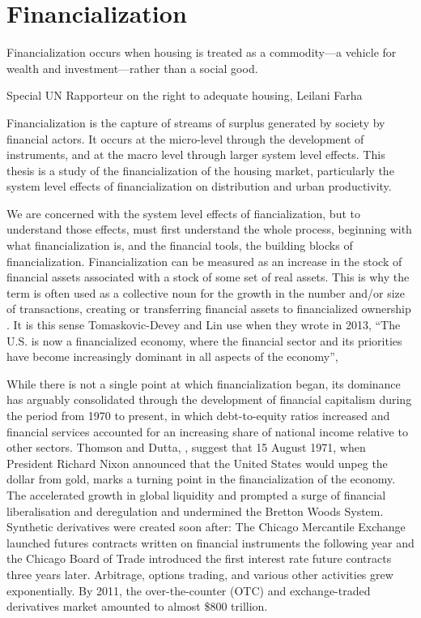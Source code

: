 \chapter{Financialization} \label{chapter-financialization}
\epigraph{Financialization occurs when housing is treated as a commodity---a vehicle for wealth and investment---rather than a social good.}{Special UN Rapporteur on the right to adequate housing, Leilani Farha \cite{farhaReportFinancializationHousing2017}}

Financialization is the capture of streams of surplus generated by society by financial actors. It occurs at the micro-level through the development of instruments, and at the macro level through larger system level effects. This thesis is a study of the financialization of the housing market, particularly the system level effects of financialization on distribution and urban productivity. 

We are concerned with the system level effects of fiancialization, but to understand those effects, must first understand the whole process, beginning with what financialization is, and the financial tools, the building blocks of financialization. 
Financialization can be measured as an increase in the stock of financial assets associated with a stock of some set of real assets. This is why the term is often used as a collective noun for the growth in the number and/or size of  transactions, creating or transferring financial assets to financialized ownership \cite{GET_financialization-numberOfTransactions}. %
It is this sense  Tomaskovic-Devey and Lin use when they wrote in 2013, ``The U.S. is now a financialized economy, where the financial sector and its priorities have become increasingly dominant in all aspects of the economy''\cite{tomaskovic-deveyFinancializationCausesInequality2013}, 

While there is not a single point at which financialization began, its dominance has arguably consolidated through the development of financial capitalism during the period from 1970 to present, in which debt-to-equity ratios increased and financial services accounted for an increasing share of national income relative to other sectors. Thomson and Dutta, \cite{thomsonFinancialisationPrimer2018}, suggest that 15 August 1971, when President Richard Nixon announced that the United States would unpeg the dollar from gold, marks a turning point in the financialization of the economy. The accelerated growth in global liquidity and prompted a surge of financial liberalisation and deregulation and undermined the Bretton Woods System. Synthetic derivatives were created soon after: The Chicago Mercantile Exchange launched futures contracts written on financial instruments the following year and the Chicago Board of Trade introduced the first interest rate future contracts three years later. Arbitrage, options trading, and various other activities grew exponentially. By 2011, the over-the-counter (OTC) and exchange-traded derivatives market amounted to almost \$800 trillion.  

